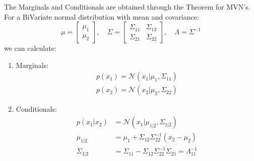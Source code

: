 \documentclass{article}
\begin{document}
The Marginals and Conditionals are obtained through the Theorem for MVN's. For a BiVariate  normal distribution with mean and covariance:
\begin{equation}
    \mu =
    \begin{bmatrix}
    \mu_1 \\
    \mu_2
    \end{bmatrix},
    \quad
    \Sigma = 
    \begin{bmatrix}
    \Sigma_{11} & \Sigma_{12} \\
    \Sigma_{21} & \Sigma_{22} 
    \end{bmatrix},
    \quad
    \Lambda = \Sigma^{-1}
\end{equation}
we can calculate:
\begin{enumerate}
    \item Marginals:
    \begin{align}
        p(x_1) = \mathcal{N}(x_1 | \mu_1, \Sigma_{11}) \\
        p(x_2) = \mathcal{N}(x_2 | \mu_2, \Sigma_{22}) 
    \end{align}
    \item Conditionals:
    \begin{align}
        p(x_1 | x_2) &= \mathcal{N}(x_1 | \mu_{1|2}, \Sigma_{1|2}) \\
        \mu_{1|2} &= \mu_1 + \Sigma_{12} \Sigma_{22}^{-1}(x_2 - \mu_2) \\
        \Sigma_{1|2} &= \Sigma_{11} - \Sigma_{12}\Sigma_{22}^{-1}\Sigma_{21} = \Lambda^{-1}_{11}
    \end{align}
\end{enumerate}
\end{document}
